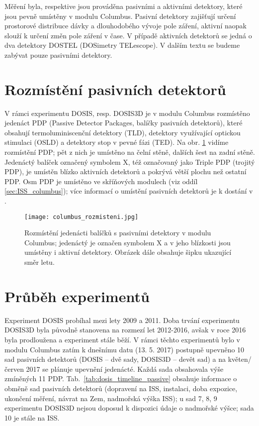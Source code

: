 Měření byla, respektive jsou prováděna pasivními a aktivními detektory, které jsou pevně umístěny v modulu Columbus. Pasivní detektory zajišťují určení prostorové distribuce dávky a dlouhodobého vývoje pole záření, aktivní naopak slouží k určení změn pole záření v čase. V případě aktivních detektorů se jedná o dva detektory DOSTEL (DOSimetry TELescope). V dalším textu se budeme zabývat pouze pasivními detektory.

\section{Rozmístění pasivních detektorů}
V rámci experimentu DOSIS, resp. DOSIS3D je v modulu Columbus rozmístěno jedenáct PDP (Passive Detector Packages, balíčky pasivních detektorů), které obsahují termoluminiscenční detektory (TLD), detektory využívající optickou stimulaci (OSLD) a detektory stop v pevné fázi (TED). Na obr. \ref{fig:columbus_rozmisteni} vidíme rozmístění PDP; pět z nich je umístěno na čelní stěně, dalších šest na zadní stěně. Jedenáctý balíček označený symbolem X, též označovaný jako Triple PDP (trojitý PDP), je umístěn blízko aktivních detektorů a pokrývá větší plochu než ostatní PDP. Osm PDP je umístěno ve skříňových modulech (viz oddíl \ref{sec:ISS_columbus}); více informací o umístění pasivních detektorů je k dostání v \cite{dosis}. %
\begin{figure}[ht]
  \centering
  \texttt{[image: columbus\_rozmisteni.jpg]}
  \caption{Rozmístění jedenácti balíčků s pasivními detektory v modulu Columbus; jedenáctý je označen symbolem X a v jeho blízkosti jsou umístěny i aktivní detektory. Obrázek dále obsahuje šipku ukazující směr letu. \cite{dosis}}
  \label{fig:columbus_rozmisteni}
\end{figure}

\section{Průběh experimentů}%
Experiment DOSIS probíhal mezi lety 2009 a 2011. Doba trvání experimentu DOSIS3D byla původně stanovena na rozmezí let 2012-2016, avšak v roce 2016 byla prodloužena a experiment stále běží. V rámci těchto experimentů bylo v modulu Columbus zatím k dnešnímu datu (13. 5. 2017) postupně upevněno 10 sad pasivních detektorů (DOSIS -- dvě sady, DOSIS3D -- devět sad) a na květen/červen 2017 se plánuje upevnění jedenácté. Každá sada obsahovala výše zmíněných 11 PDP. Tab.~\ref{tab:dosis_timeline_passive} obsahuje informace o obměně sad pasivních detektorů (dopravení na ISS, instalaci, doba expozice, ukončení měření,
návrat na Zem, nadmořská výška ISS); u sad 7, 8, 9 experimentu DOSIS3D nejsou doposud k dispozici údaje o nadmořské výšce; sada 10 je stále na ISS. 

